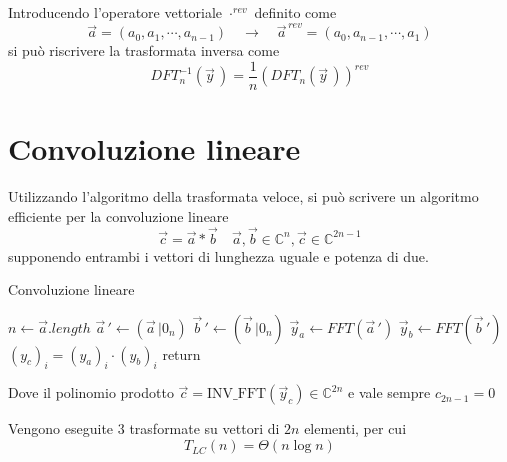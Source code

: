 Introducendo l'operatore vettoriale $\cdot^{rev}$ definito come
\begin{equation*}
    \vec{a} = \left( a_0, a_1, \cdots, a_{n-1} \right)
    \quad \rightarrow \quad
    \vec{a}^{\, rev} = \left( a_0, a_{n-1}, \cdots, a_1 \right)
\end{equation*}
si può riscrivere la trasformata inversa come
\begin{equation*}
    DFT_{n}^{-1} \left( \vec{y} \, \right) = \frac{1}{n} \left( DFT_{n} \left( \vec{y} \, \right) \right)^{rev}
\end{equation*}

\section{Convoluzione lineare}

Utilizzando l'algoritmo della trasformata veloce, si può scrivere un algoritmo efficiente per la convoluzione lineare
\begin{equation*}
    \vec{c} = \vec{a} * \vec{b}
    \quad
    \vec{a}, \vec{b} \in \mathbb{C}^n, \vec{c} \in \mathbb{C}^{2n-1}
\end{equation*}
supponendo entrambi i vettori di lunghezza uguale e potenza di due.

\begin{algorithm}[H]
\caption{Convoluzione lineare}\label{alg:convlin}
\begin{algorithmic}[1]
        \State $n \gets \vec{a}.length$
        \State $\vec{a}\,' \gets \left( \vec{a} \, | 0_n \right)$
        \State $\vec{b}\,' \gets \left( \vec{b} \, | 0_n \right)$
        \State $\vec{y}_a \gets FFT \left( \vec{a}\,' \right)$
        \State $\vec{y}_b \gets FFT \left( \vec{b}\,' \right)$
        \State $ \left( y_c \right)_i = \left( y_a \right)_i \cdot \left( y_b \right)_i $
        \EndFor
        \State return 
    \EndProcedure
\end{algorithmic}
\end{algorithm}

Dove il polinomio prodotto $\vec{c} = \text{INV\_FFT}\left( \vec{y}_c \right) \in \mathbb{C}^{2n}$ e vale sempre $c_{2n-1}=0$

Vengono eseguite $3$ trasformate su vettori di $2n$ elementi, per cui
\begin{equation*}
    T_{LC} (n) = \Theta \left( n \log n \right)
\end{equation*}

